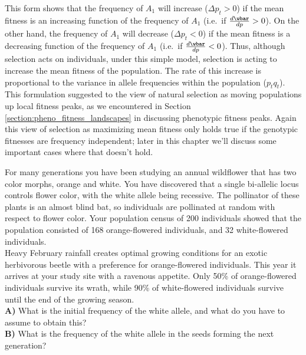 This form shows that the frequency of $A_1$ will increase ($\Delta p_t > 0$) if the mean fitness is an increasing function of the frequency of $A_1$ (i.e.\ if $\frac{d \wbar}{dp}>0$). On the other hand, the frequency of $A_1$ will decrease ($\Delta p_t < 0$) if the mean fitness is a decreasing function of the frequency of $A_1$ (i.e.\ if $\frac{d \wbar}{dp}<0$).
Thus, although selection acts on
individuals, under this simple model, selection is acting to increase
the mean fitness of the population. The rate of this increase is proportional to
the variance in allele frequencies within the population
($p_tq_t$). This formulation suggested to \citet{wright1932} the view of natural
selection as moving populations up local fitness peaks, as we
encountered in Section \ref{section:pheno_fitness_landscapes} in
discussing phenotypic fitness peaks. Again this view of selection as
maximizing mean fitness only holds true
if the genotypic fitnesses are frequency independent; later in this
chapter we'll discuss some important cases where that doesn't hold. \\


\begin{question}{}
For many generations you have been studying an annual wildflower that has two color morphs, orange and white. You have discovered that a single bi-allelic locus controls flower color, with the white allele being recessive. The pollinator of these plants is an almost blind bat, so individuals are pollinated at random with respect to flower color. Your population census of 200 individuals showed that the population consisted of 168 orange-flowered individuals, and 32 white-flowered individuals.\\
Heavy February rainfall creates optimal growing conditions for an
exotic herbivorous beetle with a preference for orange-flowered
individuals.  This year it arrives at your study site with a ravenous
appetite.  Only 50\% of orange-flowered individuals survive its wrath,
while 90\% of white-flowered individuals survive until the end of the
growing season.  \\
{\bf A)} What is the initial frequency of the white allele, and what do you
have to assume to obtain this?\\
{\bf B)} What is the frequency of the white allele in the seeds forming the next generation?\\
\end{question}


